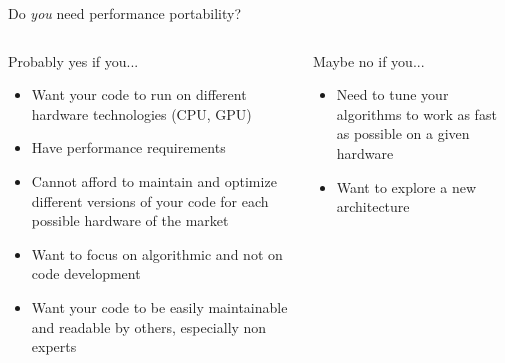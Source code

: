 \documentclass[aspectratio=169]{beamer}
\begin{document}
\begin{frame}{Do \emph{you} need performance portability?}
    \begin{columns}
        \begin{column}{0.5\linewidth}
            \begin{block}{Probably yes if you...}
                \begin{itemize}
                    \item Want your code to run on different hardware technologies (CPU, GPU)
                    \item Have performance requirements
                    \item Cannot afford to maintain and optimize different versions of your code for each possible hardware of the market
                    \item Want to focus on algorithmic and not on code development
                    \item Want your code to be easily maintainable and readable by others, especially non experts
                \end{itemize}
            \end{block}
        \end{column}
        \begin{column}{0.5\linewidth}
            \begin{block}{Maybe no if you...}
                \begin{itemize}
                    \item Need to tune your algorithms to work as fast as possible on a given hardware
                    \item Want to explore a new architecture
                \end{itemize}
            \end{block}
        \end{column}
    \end{columns}
\end{frame}

\end{document}

